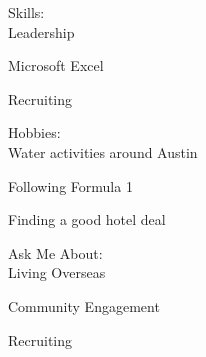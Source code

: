 \documentclass[10pt,A4]{article}
\newcommand{\metasection}[3]
{
{#1} \hspace*{\fill} {#2} \hspace*{\fill} {#3}\\[1pt]
}
\newcommand{\vthemebox}[4]{
\begin{center}
\large{#1}\normalsize\\
    \vspace{8pt}
    {#2} 

    {#3} 

    {#4} 
\end{center}
}
\newcommand{\mystrut}{\rule[-.3\baselineskip]{0pt}{\baselineskip}}
\begin{document}
\metasection{
    \vthemebox{Skills:}
        {Leadership}
        {Microsoft Excel}
        {Recruiting}
    }
    {\vthemebox{Hobbies:}
        {Water activities around Austin}
        {Following Formula 1}
        {Finding a good hotel deal}
    }
    {\vthemebox{Ask Me About:}
        {Living Overseas}
        {Community Engagement}
        {Recruiting}}







%
%
%
%
%
%
\end{document}
